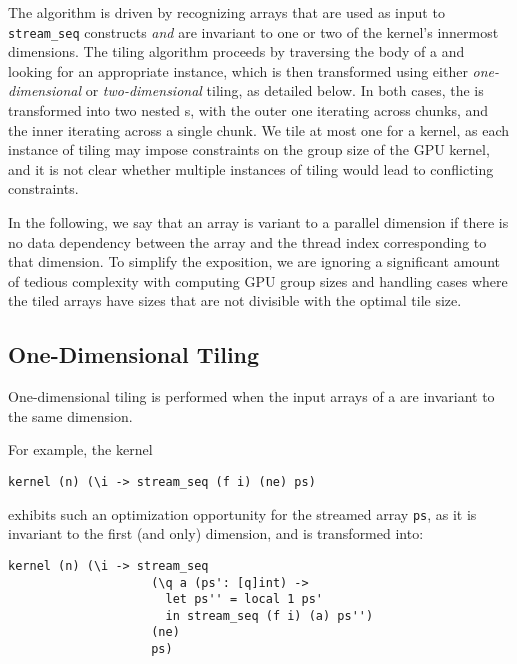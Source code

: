 The algorithm is driven by recognizing arrays that are used as input
to \lstinline{stream_seq} constructs \textit{and} are invariant to one
or two of the kernel's innermost dimensions.  The tiling algorithm
proceeds by traversing the body of a  and looking for an
appropriate \StreamSeq{} instance, which is then transformed using
either \textit{one-dimensional} or \textit{two-dimensional} tiling, as
detailed below.  In both cases, the \StreamSeq{} is transformed into
two nested \StreamSeq{}s, with the outer one iterating across chunks,
and the inner iterating across a single chunk.  We tile at most one
\StreamSeq{} for a kernel, as each instance of tiling may impose
constraints on the group size of the GPU kernel, and it is not clear
whether multiple instances of tiling would lead to conflicting
constraints.

In the following, we say that an array is variant to a parallel
dimension if there is no data dependency between the array and the
thread index corresponding to that dimension.  To simplify the
exposition, we are ignoring a significant amount of tedious complexity
with computing GPU group sizes and handling cases where the tiled
arrays have sizes that are not divisible with the optimal tile size.

\subsection{One-Dimensional Tiling}
\label{sec:one-dimensional-tiling}

One-dimensional tiling is performed when the input arrays of a
\StreamSeq{} are invariant to the same dimension.

For example, the kernel
\begin{lstlisting}
kernel (n) (\i -> stream_seq (f i) (ne) ps)
\end{lstlisting}

\noindent exhibits such an optimization opportunity for the streamed
array \lstinline{ps}, as it is invariant to the first (and only)
dimension, and is transformed into:

\begin{lstlisting}
kernel (n) (\i -> stream_seq
                    (\q a (ps': [q]int) ->
                      let ps'' = local 1 ps'
                      in stream_seq (f i) (a) ps'')
                    (ne)
                    ps)
\end{lstlisting}


